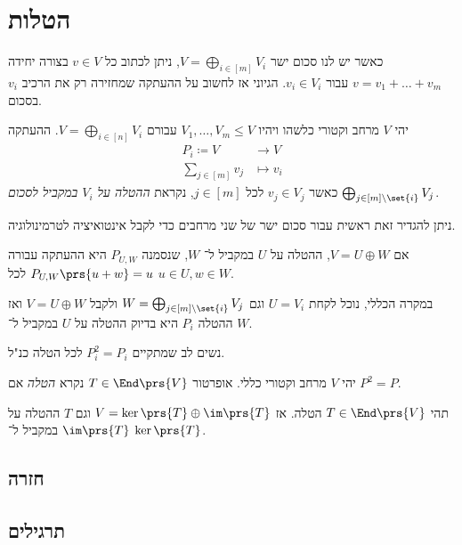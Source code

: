 \documentclass[a4paper,10pt,twoside,openany]{book}
\begin{document}
\section{הטלות}

כאשר יש לנו סכום ישר
$V = \bigoplus_{i \in [m]} V_i$,
ניתן לכתוב כל
$v \in V$
בצורה יחידה
$v = v_1 + \ldots + v_m$
עבור
$v_i \in V_i$.
הגיוני אז לחשוב על ההעתקה שמחזירה רק את הרכיב
$v_i$
בסכום.

\begin{definition}
יהי
$V$
מרחב וקטורי כלשהו ויהיו
$V_1, \ldots, V_m \leq V$
עבורם
$V = \bigoplus_{i \in [n]} V_i$.
ההעתקה
\begin{align*}
P_i \coloneq V &\to V \\
\sum_{j \in [m]} v_j &\mapsto v_i
\end{align*}
כאשר
$v_j \in V_j$
לכל
$j \in [m]$,
נקראת
\emph{ההטלה על
$V_i$
במקביל לסכום
$\bigoplus_{j \in [m] \setminus \set{i}} V_j$}.
\end{definition}

\begin{remark}
ניתן להגדיר זאת ראשית עבור סכום ישר של שני מרחבים כדי לקבל אינטואיציה לטרמינולוגיה.

אם
$V = U \oplus W$,
ההטלה על
$U$
במקביל ל־%
$W$,
שנסמנה
$P_{U,W}$
היא ההעתקה עבורה
$P_{U,W}\prs{u+w} = u$
לכל
$u \in U, w \in W$.

במקרה הכללי, נוכל לקחת
$U = V_i$
וגם
$W = \bigoplus_{j \in [m] \setminus \set{i}} V_j$
ולקבל
$V = U \oplus W$
ואז ההטלה
$P_i$
היא בדיוק ההטלה על
$U$
במקביל ל־%
$W$.
\end{remark}

נשים לב שמתקיים
$P_i^2 = P_i$
לכל הטלה כנ"ל.

\begin{definition}
יהי
$V$
מרחב וקטורי כללי.
אופרטור
$T \in \End\prs{V}$
נקרא
\emph{הטלה}
אם
$P^2 = P$.
\end{definition}

\begin{proposition}
תהי
$T \in \End\prs{V}$
הטלה.
אז
$V = \ker\prs{T} \oplus \im\prs{T}$
וגם
$T$
ההטלה על
$\im\prs{T}$
במקביל ל־%
$\ker\prs{T}$.
\end{proposition}

\subsection{חזרה}

\subsection{תרגילים}
\end{document}
